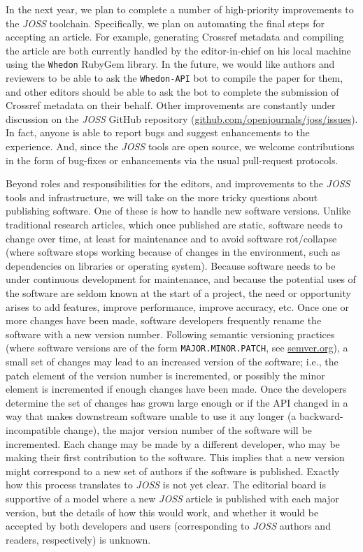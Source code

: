 \documentclass{article}
\newcommand\joss{\textit{JOSS}}
\begin{document}
In the next year, we plan to complete a number of high-priority improvements to the \joss{} toolchain.
Specifically, we plan on automating the final steps for accepting an article.
For example, generating Crossref metadata and compiling the article are both currently handled by the editor-in-chief on his local machine using the \texttt{Whedon} RubyGem library.
In the future, we would like authors and reviewers to be able to ask the \texttt{Whedon-API} bot to compile the paper for them, and other editors should be able to ask the bot to complete the submission of Crossref metadata on their behalf.
Other improvements are constantly under discussion on the \joss{} GitHub repository
(\href{https://github.com/openjournals/joss/issues}{github.com/openjournals/joss/issues}).
In fact, anyone is able to report bugs and suggest enhancements to the experience.
And, since the \joss{} tools are open source, we welcome contributions in the form of bug-fixes or enhancements via the usual pull-request protocols.

Beyond roles and responsibilities for the editors, and improvements to the \joss{} tools and infrastructure, we will take on the more tricky questions about publishing software.
One of these is how to handle new software versions.
Unlike traditional research articles, which once published are static, software needs to change
over time, at least for maintenance and to avoid software
rot\slash collapse (where software stops working because
of changes in the environment, such as dependencies on
libraries or operating system).
Because software needs to be under continuous development for
maintenance, and because the potential uses of the
software are seldom known at the start of a project,
the need or opportunity arises to add features, improve performance,
improve accuracy, etc. Once one or more changes have been made,
software developers frequently rename the software with a new
version number. Following semantic versioning practices (where software versions are of the form \texttt{MAJOR.MINOR.PATCH}, see \href{http://semver.org}{semver.org}), a small
set of changes may lead to an increased version of the software;
i.e., the patch element of the version number is incremented,
or possibly the minor element is incremented if enough changes have been made.
Once the developers determine the set of changes has
grown large enough or if the API changed in a way
that makes downstream software unable to use it any longer
(a backward-incompatible change), the major version number of
the software will be incremented.
Each change may be made by a different developer, who may be making their
first contribution to the software. This implies that a new version
might correspond to a new set of authors if the software is published.
Exactly how this process translates to \joss{} is not yet clear.
The editorial board is supportive of a model where a new \joss{} article is published with each major version, but
the details of how this would work, and whether it would be accepted
by both developers and users (corresponding to \joss{} authors and readers, respectively) is unknown.
\end{document}
